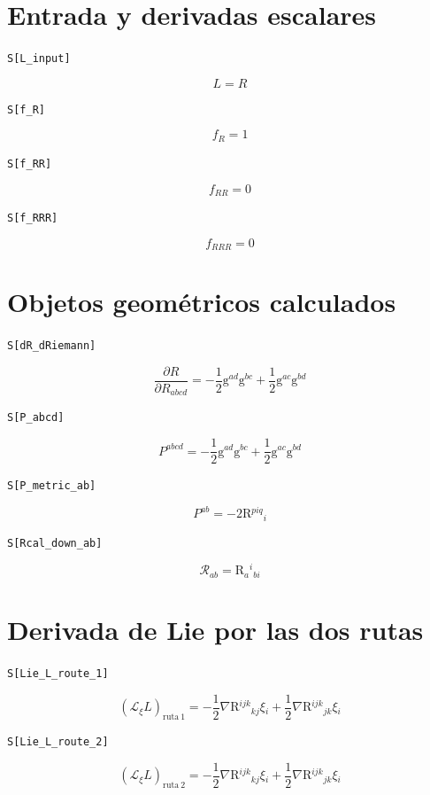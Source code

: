 \section*{Entrada y derivadas escalares}

\noindent\texttt{S[L\_input]}

\[
\boxed{L = R}
\]


\noindent\texttt{S[f\_R]}

\[
\boxed{f_R = 1}
\]


\noindent\texttt{S[f\_RR]}

\[
\boxed{f_{RR} = 0}
\]


\noindent\texttt{S[f\_RRR]}

\[
\boxed{f_{RRR} = 0}
\]


\section*{Objetos geométricos calculados}

\noindent\texttt{S[dR\_dRiemann]}

\[
\boxed{\dfrac{\partial R}{\partial R_{abcd}} = -\frac{1}{2}\mathrm{g}{}^{ad}\mathrm{g}{}^{bc} + \frac{1}{2}\mathrm{g}{}^{ac}\mathrm{g}{}^{bd}}
\]


\noindent\texttt{S[P\_abcd]}

\[
\boxed{P^{abcd} = -\frac{1}{2}\mathrm{g}{}^{ad}\mathrm{g}{}^{bc} + \frac{1}{2}\mathrm{g}{}^{ac}\mathrm{g}{}^{bd}}
\]


\noindent\texttt{S[P\_metric\_ab]}

\[
\boxed{P^{ab} = -2\mathrm{R}{}^{piq}{}_{i}}
\]


\noindent\texttt{S[Rcal\_down\_ab]}

\[
\boxed{\mathcal{R}_{ab} = \mathrm{R}{}_{a}{}^{i}{}_{bi}}
\]


\section*{Derivada de Lie por las dos rutas}

\noindent\texttt{S[Lie\_L\_route\_1]}

\[
\boxed{\left(\mathcal{L}_{\xi}L\right)_{\mathrm{ruta\ 1}} = -\frac{1}{2}\nabla \mathrm{R}{}^{ijk}{}_{kj}\xi{}_{i} + \frac{1}{2}\nabla \mathrm{R}{}^{ijk}{}_{jk}\xi{}_{i}}
\]


\noindent\texttt{S[Lie\_L\_route\_2]}

\[
\boxed{\left(\mathcal{L}_{\xi}L\right)_{\mathrm{ruta\ 2}} = -\frac{1}{2}\nabla \mathrm{R}{}^{ijk}{}_{kj}\xi{}_{i} + \frac{1}{2}\nabla \mathrm{R}{}^{ijk}{}_{jk}\xi{}_{i}}
\]



